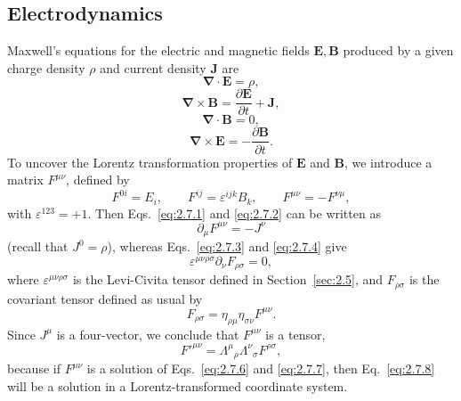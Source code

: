
\subsection{Electrodynamics}\label{sec:2.7}

Maxwell's equations for the electric and magnetic fields \(\mathbf E,\mathbf B\)
produced by a given charge density \(\rho\) and current density \(\mathbf J\)
are
\begin{equation}
  \boldsymbol{\nabla}\cdot\mathbf E=\rho ,
  \tag{2.7.1}\label{eq:2.7.1}
\end{equation}
\begin{equation}
  \boldsymbol{\nabla}\times\mathbf B
  =\frac{\partial\mathbf E}{\partial t}+\mathbf J ,
  \tag{2.7.2}\label{eq:2.7.2}
\end{equation}
\begin{equation}
  \boldsymbol{\nabla}\cdot\mathbf B=0 ,
  \tag{2.7.3}\label{eq:2.7.3}
\end{equation}
\begin{equation}
  \boldsymbol{\nabla}\times\mathbf E
  =-\frac{\partial\mathbf B}{\partial t}.
  \tag{2.7.4}\label{eq:2.7.4}
\end{equation}
To uncover the Lorentz transformation properties of \(\mathbf E\) and
\(\mathbf B\), we introduce a matrix \(F^{\mu\nu}\), defined by
\begin{equation}
  F^{0i}=E_i,\qquad
  F^{ij}=\varepsilon^{ijk}B_k,\qquad
  F^{\mu\nu}=-F^{\nu\mu},
  \tag{2.7.5}\label{eq:2.7.5}
\end{equation}
with \(\varepsilon^{123}=+1\). Then Eqs.~\eqref{eq:2.7.1} and
\eqref{eq:2.7.2} can be written as
\begin{equation}
  \partial_\mu F^{\mu\nu}=-J^\nu
  \tag{2.7.6}\label{eq:2.7.6}
\end{equation}
(recall that \(J^0=\rho\)), whereas Eqs.~\eqref{eq:2.7.3} and
\eqref{eq:2.7.4} give
\begin{equation}
  \varepsilon^{\mu\nu\rho\sigma}\partial_\nu F_{\rho\sigma}=0 ,
  \tag{2.7.7}\label{eq:2.7.7}
\end{equation}
where \(\varepsilon^{\mu\nu\rho\sigma}\) is the Levi-Civita tensor defined in
Section~\ref{sec:2.5}, and \(F_{\rho\sigma}\) is the covariant tensor defined
as usual by
\[
  F_{\rho\sigma}
  =\eta_{\rho\mu}\eta_{\sigma\nu}F^{\mu\nu}.
\]
Since \(J^\mu\) is a four-vector, we conclude that \(F^{\mu\nu}\) is a tensor,
\begin{equation}
  F'^{\mu\nu}
  =\Lambda^\mu{}_\rho\Lambda^\nu{}_\sigma F^{\rho\sigma},
  \tag{2.7.8}\label{eq:2.7.8}
\end{equation}
because if \(F^{\mu\nu}\) is a solution of Eqs.~\eqref{eq:2.7.6} and
\eqref{eq:2.7.7}, then Eq.~\eqref{eq:2.7.8} will be a solution in a
Lorentz-transformed coordinate system.

